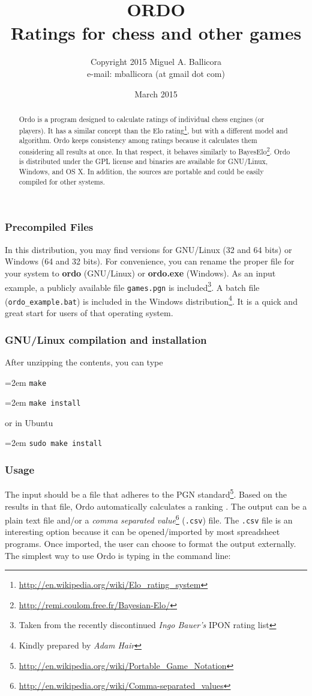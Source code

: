 \documentclass[12pt]{article}
\title{ORDO  \\ Ratings for chess and other games}
\author{Copyright \cpyrht{} 2015 Miguel A. Ballicora\\e-mail: mballicora (at gmail dot com)}
\date{March 2015}
\newcommand{\rgstrd} {\textsuperscript{\textregistered{}}}
\newcommand{\person} [1] {\textit{#1}}
\newcommand{\filename} [1] {\texttt{#1}}
\newcommand{\cmdln}[1]{
	\par
	\begingroup
		\leftskip=2em
		\addtolength{\rightskip}{0em}
		\noindent \small{\texttt{#1}}
		\par
	\endgroup
}
\begin{document}
   \maketitle

\begin{abstract}
Ordo is a program designed to calculate ratings of individual chess engines (or players).
It has a similar concept than the Elo rating\footnote{\url{http://en.wikipedia.org/wiki/Elo_rating_system}}, but with a different model and algorithm. 
Ordo keeps consistency among ratings because it calculates them considering all results at once.
In that respect, it behaves similarly to BayesElo\footnote{\url{http://remi.coulom.free.fr/Bayesian-Elo/}}.
Ordo is distributed under the GPL license and binaries are available for GNU/Linux, Windows\rgstrd{}, and OS X.
In addition, the sources are portable and could be easily compiled for other systems. 
\end{abstract}

\subsubsection*{Precompiled Files}
In this distribution, you may find versions for GNU/Linux (32 and 64 bits) or Windows\rgstrd{} (64 and 32 bits). 
For convenience, you can rename the proper file for your system to \textbf{ordo} (GNU/Linux) or \textbf{ordo.exe} (Windows\rgstrd{}). 
As an input example, a publicly available file \filename{games.pgn} is included\footnote{Taken from the recently discontinued \person{Ingo Bauer's} IPON rating list}. 
A batch file (\filename{ordo\_example.bat}) is included in the Windows\rgstrd{} distribution\footnote{Kindly prepared by \person{Adam Hair}}. 
It is a quick and great start for users of that operating system.

\subsubsection*{GNU/Linux compilation and installation}
After unzipping the contents, you can type
\cmdln{make}
\cmdln{make install}
or in Ubuntu
\cmdln{sudo make install}

\subsubsection*{Usage}
The input should be a file that adheres to the PGN standard\footnote{\url{http://en.wikipedia.org/wiki/Portable_Game_Notation}}. 
Based on the results in that file, Ordo automatically calculates a ranking . 
The output can be a plain text file and/or a \textit{comma separated value}\footnote{\url{http://en.wikipedia.org/wiki/Comma-separated_values}} (\filename{.csv}) file.
The \filename{.csv} file is an interesting option because it can be opened/imported by most spreadsheet programs. 
Once imported, the user can choose to format the output externally.
The simplest way to use Ordo is typing in the command line:
\end{document}
